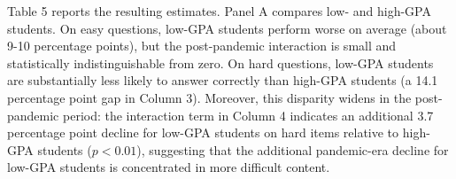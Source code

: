\documentclass[
  12pt,
  letterpaper,
  DIV=11,
  numbers=noendperiod]{scrartcl}
\begin{document}
Table 5 reports the resulting estimates. Panel A compares low- and
high-GPA students. On easy questions, low-GPA students perform worse on
average (about 9-10 percentage points), but the post-pandemic
interaction is small and statistically indistinguishable from zero. On
hard questions, low-GPA students are substantially less likely to answer
correctly than high-GPA students (a 14.1 percentage point gap in Column
3). Moreover, this disparity widens in the post-pandemic period: the
interaction term in Column 4 indicates an additional 3.7 percentage
point decline for low-GPA students on hard items relative to high-GPA
students (\(p < 0.01\)), suggesting that the additional pandemic-era
decline for low-GPA students is concentrated in more difficult content.

\begin{table}[H]
\centering\begingroup\fontsize{9}{11}\selectfont


\end{table}
\end{document}

